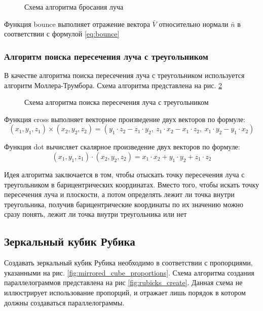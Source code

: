 \begin{figure}[!ht]
	\caption{Схема алгоритма бросания луча}
	\label{fig:throw_ray}
\end{figure}

Функция bounce выполняет отражение вектора $\bar V$ относительно нормали $\bar n$ в соответствии с формулой \ref{eq:bounce}

\subsubsection{Алгоритм поиска пересечения луча с треугольником}
В качестве алгоритма поиска пересечения луча с треугольником используется алгоритм Моллера-Трумбора\cite{bib:mollertrumbor}. Схема алгоритма представлена на рис. \ref{fig:triangle_intersec}
\begin{figure}[!ht]
	\caption{Схема алгоритма поиска пересечения луча с треугольником}
	\label{fig:triangle_intersec}
\end{figure}

Функция cross выполняет векторное произведение двух векторов по формуле:
\begin{equation}
	(x_1, y_1, z_1)\times(x_2, y_2, z_2)=(y_1\cdot z_2-z_1\cdot y_2,~z_1\cdot x_2-x_1\cdot z_2,~x_1\cdot y_2-y_1\cdot x_2)
\end{equation}

Функция dot вычисляет скалярное произведение двух векторов по формуле:
\begin{equation}
	(x_1, y_1, z_1)\cdot(x_2, y_2, z_2) = x_1\cdot x_2+y_1\cdot y_2+z_1\cdot z_2
\end{equation}

Идея алгоритма заключается в том, чтобы отыскать точку пересечения луча с треугольником в барицентрических координатах. Вместо того, чтобы искать точку пересечения луча и плоскости, а потом определять лежит ли точка внутри треугольника, получив барицентрические координаты по их значению можно сразу понять, лежит ли точка внутри треугольника или нет

\subsection{Зеркальный кубик Рубика}
Создавать зеркальный кубик Рубика необходимо в соответствии с пропорциями, указанными на рис. \ref{fig:mirrored_cube_proportions}. Схема алгоритма создания параллелограммов представлена на рис \ref{fig:rubicks_create}. Данная схема не иллюстрирует использование пропорций, и отражает лишь порядок в котором должны создаваться параллелограммы.

